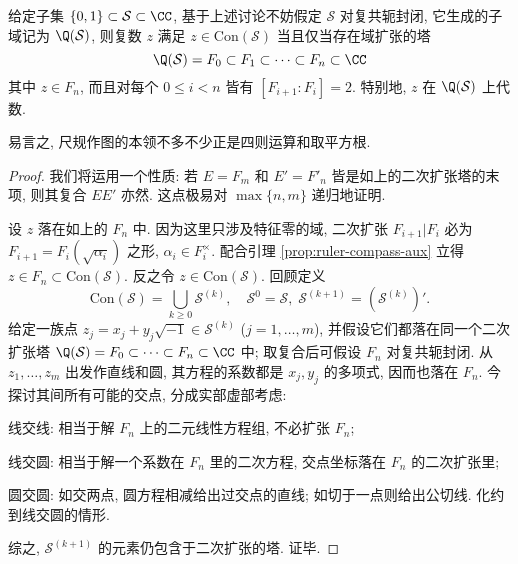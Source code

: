 \begin{theorem}\label{prop:characterization-constructible}
	给定子集 $\{0, 1\} \subset \mathcal{S} \subset \CC$, 基于上述讨论不妨假定 $\mathcal{S}$ 对复共轭封闭, 它生成的子域记为 $\Q(\mathcal{S})$, 则复数 $z$ 满足 $z \in \mathrm{Con}(\mathcal{S})$ 当且仅当存在域扩张的塔
	\[ \Q(\mathcal{S}) = F_0 \subset F_1 \subset \cdots \subset F_n \subset \CC \]
	其中 $z \in F_n$, 而且对每个 $0 \leq i < n$ 皆有 $[F_{i+1} : F_i] = 2$. 特别地, $z$ 在 $\Q(\mathcal{S})$ 上代数.
\end{theorem}
易言之, 尺规作图的本领不多不少正是四则运算和取平方根.
\begin{proof}
	我们将运用一个性质: 若 $E = F_m$ 和 $E' = F'_n$ 皆是如上的二次扩张塔的末项, 则其复合 $EE'$ 亦然. 这点极易对 $\max\{n,m\}$ 递归地证明.

	设 $z$ 落在如上的 $F_n$ 中. 因为这里只涉及特征零的域, 二次扩张 $F_{i+1}|F_i$ 必为 $F_{i+1} = F_i(\sqrt{\alpha_i})$ 之形, $\alpha_i \in F_i^\times$. 配合引理 \ref{prop:ruler-compass-aux} 立得 $z \in F_n \subset \text{Con}(\mathcal{S})$. 反之令 $z \in \text{Con}(\mathcal{S})$. 回顾定义
	\[ \text{Con}(\mathcal{S}) = \bigcup_{k \geq 0} \mathcal{S}^{(k)}, \quad \mathcal{S}^0 = \mathcal{S}, \; \mathcal{S}^{(k+1)} = (\mathcal{S}^{(k)})'. \]
	给定一族点 $z_j = x_j + y_j \sqrt{-1} \in \mathcal{S}^{(k)}$ ($j=1,\ldots, m$), 并假设它们都落在同一个二次扩张塔 $\Q(\mathcal{S}) = F_0 \subset \cdots \subset F_n \subset \CC$ 中; 取复合后可假设 $F_n$ 对复共轭封闭. 从 $z_1, \ldots, z_m$ 出发作直线和圆, 其方程的系数都是 $x_j, y_j$ 的多项式, 因而也落在 $F_n$. 今探讨其间所有可能的交点, 分成实部虚部考虑:
	\begin{compactenum}[(a)]
		\item 线交线: 相当于解 $F_n$ 上的二元线性方程组, 不必扩张 $F_n$;
		\item 线交圆: 相当于解一个系数在 $F_n$ 里的二次方程, 交点坐标落在 $F_n$ 的二次扩张里;
		\item 圆交圆: 如交两点, 圆方程相减给出过交点的直线; 如切于一点则给出公切线. 化约到线交圆的情形.
	\end{compactenum}
	综之, $\mathcal{S}^{(k+1)}$ 的元素仍包含于二次扩张的塔. 证毕.
\end{proof}

